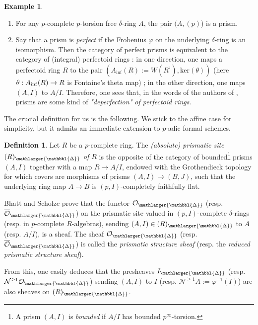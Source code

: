 \documentclass{amsart}
\newcommand{\prism}{{\mathlarger{\mathbbl{\Delta}}}}
\theoremstyle{plain}
\theoremstyle{definition}
\newtheorem{definition}[theorem]{Definition}
\newtheorem{example}[theorem]{Example}
\renewcommand{\inf}{\mathrm{inf}}
\newcommand{\blue}[1]{{\color{black}#1}}
\begin{document}
\begin{example}
\begin{enumerate}
\item For any $p$-complete $p$-torsion free $\delta$-ring $A$, the pair $(A,(p)$) is a prism.
\item Say that a prism is \textit{perfect} if the Frobenius $\varphi$ on the \blue{underlying} $\delta$-ring is an isomorphism. Then the category of perfect prisms is equivalent to the category of (integral) perfectoid rings : in one direction, one maps a perfectoid ring $R$ to the pair $(A_{\inf}(R):=W(R^{\flat}), \mathrm{ker}(\theta))$ (here $\theta : A_{\rm inf}(R) \to R$ is Fontaine's theta map) ; in the other direction, one maps $(A,I)$ to $A/I$. Therefore, one sees that, in the words of the authors of \cite{bhatt_scholze_prisms_and_prismatic_cohomology}, prisms are some kind of \textit{"deperfection" of perfectoid rings}.
\end{enumerate}
\end{example}

The crucial definition for us is the following. We stick to the affine case for simplicity, but it admits an immediate extension to $p$-adic formal schemes. 
\begin{definition}
Let $R$ be a $p$-complete ring. The \textit{(absolute) prismatic site $(R)_{\prism}$ of $R$} is the opposite of the category of bounded\footnote{A prism $(A,I)$ is \textit{bounded} if $A/I$ has bounded $p^{\infty}$-torsion.} prisms $(A,I)$ together with a map $R \to A/I$, endowed with the Grothendieck topology for which covers are morphisms of prisms $(A, I) \to (B,J)$, such that the underlying ring map $A\to B$ is $(p,I)$-completely faithfully flat. 
\end{definition} 


Bhatt and Scholze prove that the functor $\mathcal{O}_{\prism}$ (resp. $\overline{\mathcal{O}}_{\prism}$) on the prismatic site valued in $(p,I)$-complete $\delta$-rings (resp. in $p$-complete $R$-algebras), sending $(A,I) \in (R)_{\prism}$ to $A$ (resp. $A/I$), is a sheaf. The sheaf $\mathcal{O}_{\prism}$ (resp. $\overline{\mathcal{O}}_{\prism}$) is called the \textit{prismatic structure sheaf} (resp. the \textit{reduced prismatic structure sheaf}).  

From this, one easily deduces that the presheaves $I_{\prism}$ (resp. $\mathcal{N}^{\geq 1} \mathcal{O}_{\prism}$) sending $(A,I)$ to $I$ (resp. $\mathcal{N}^{\geq 1} A:=\varphi^{-1}(I)$) are also sheaves on $(R)_{\prism}$. 
\\
\end{document}
